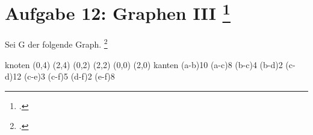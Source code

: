 \documentclass{lehramt-informatik-aufgabe}
\begin{document}

\section{Aufgabe 12: Graphen III
\footcite[(entnommen aus Algorithmen und Datenstrukturen, Übungsblatt 7, Universität Würzburg)]{aud:pu:7}}

Sei G der folgende Graph.
\footcite[Thema 2 Aufgabe 4 (gekürzt)]{examen:46115:2018:03}

\graph knoten {
  (0,4)
  (2,4)
  (0,2)
  (2,2)
  (0,0)
  (2,0)
} kanten {
  \kante(a-b){10}
  \kante(a-c){8}
  \kante(b-c){4}
  \kante(b-d){2}
  \kante(c-d){12}
  \kante(c-e){3}
  \kante(c-f){5}
  \kante(d-f){2}
  \kante(e-f){8}
}
\end{document}
